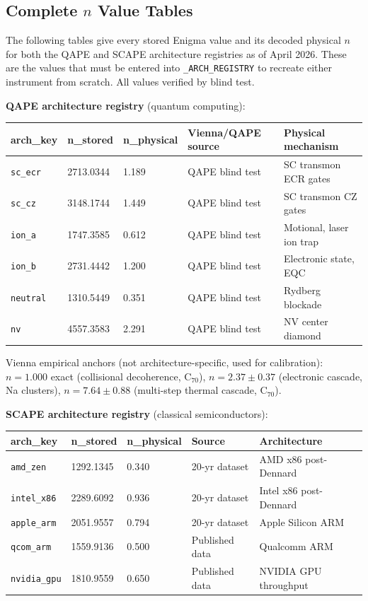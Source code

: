 \documentclass[12pt,a4paper]{article}
\begin{document}
\subsection{Complete $n$ Value Tables}

The following tables give every stored Enigma value and its decoded physical
$n$ for both the QAPE and SCAPE architecture registries as of April 2026.
These are the values that must be entered into \texttt{\_ARCH\_REGISTRY} to
recreate either instrument from scratch. All values verified by blind test.

\textbf{QAPE architecture registry} (quantum computing):

\begin{center}
\begin{tabular}{lllll}
\toprule
\textbf{arch\_key} & \textbf{n\_stored} & \textbf{n\_physical} &
\textbf{Vienna/QAPE source} & \textbf{Physical mechanism} \\
\midrule
\texttt{sc\_ecr} & 2713.0344 & 1.189 & QAPE blind test & SC transmon ECR gates \\
\texttt{sc\_cz}  & 3148.1744 & 1.449 & QAPE blind test & SC transmon CZ gates \\
\texttt{ion\_a}  & 1747.3585 & 0.612 & QAPE blind test & Motional, laser ion trap \\
\texttt{ion\_b}  & 2731.4442 & 1.200 & QAPE blind test & Electronic state, EQC \\
\texttt{neutral} & 1310.5449 & 0.351 & QAPE blind test & Rydberg blockade \\
\texttt{nv}      & 4557.3583 & 2.291 & QAPE blind test & NV center diamond \\
\bottomrule
\end{tabular}
\end{center}

\noindent
Vienna empirical anchors (not architecture-specific, used for calibration):
$n = 1.000$ exact (collisional decoherence, C$_{70}$),
$n = 2.37 \pm 0.37$ (electronic cascade, Na clusters),
$n = 7.64 \pm 0.88$ (multi-step thermal cascade, C$_{70}$).

\medskip
\textbf{SCAPE architecture registry} (classical semiconductors):

\begin{center}
\begin{tabular}{lllll}
\toprule
\textbf{arch\_key} & \textbf{n\_stored} & \textbf{n\_physical} &
\textbf{Source} & \textbf{Architecture} \\
\midrule
\texttt{amd\_zen}   & 1292.1345 & 0.340 & 20-yr dataset & AMD x86 post-Dennard \\
\texttt{intel\_x86} & 2289.6092 & 0.936 & 20-yr dataset & Intel x86 post-Dennard \\
\texttt{apple\_arm} & 2051.9557 & 0.794 & 20-yr dataset & Apple Silicon ARM \\
\texttt{qcom\_arm}  & 1559.9136 & 0.500 & Published data & Qualcomm ARM \\
\texttt{nvidia\_gpu}& 1810.9559 & 0.650 & Published data & NVIDIA GPU throughput \\
\bottomrule
\end{tabular}
\end{center}
\end{document}
